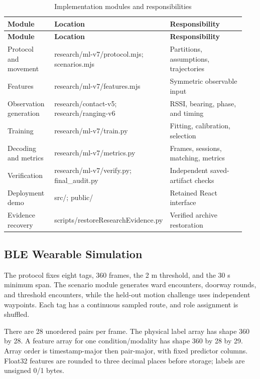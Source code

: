\documentclass[12pt,a4paper]{report}
\begin{document}
\begingroup
\small{}\setlength{\tabcolsep}{3pt}
\begin{longtable}{>{\raggedright\arraybackslash}p{0.200\linewidth}>{\raggedright\arraybackslash}p{0.400\linewidth}>{\raggedright\arraybackslash}p{0.340\linewidth}}
\caption{Implementation modules and responsibilities}\label{tab:files}\\
\toprule
\textbf{Module} & \textbf{Location} & \textbf{Responsibility}\\
\midrule
\endfirsthead
\toprule
\textbf{Module} & \textbf{Location} & \textbf{Responsibility}\\
\midrule
\endhead
\bottomrule
\endfoot
Protocol and movement & research/\allowbreak{}ml-v7/\allowbreak{}protocol.mjs; scenarios.mjs & Partitions, assumptions, trajectories\\
Features & research/\allowbreak{}ml-v7/\allowbreak{}features.mjs & Symmetric observable input\\
Observation generation & research/\allowbreak{}contact-v5; research/\allowbreak{}ranging-v6 & RSSI, bearing, phase, and timing\\
Training & research/\allowbreak{}ml-v7/\allowbreak{}train.py & Fitting, calibration, selection\\
Decoding and metrics & research/\allowbreak{}ml-v7/\allowbreak{}metrics.py & Frames, sessions, matching, metrics\\
Verification & research/\allowbreak{}ml-v7/\allowbreak{}verify.py; final\_audit.py & Independent saved-artifact checks\\
Deployment demo & src/\allowbreak{}; public/\allowbreak{} & Retained React interface\\
Evidence recovery & scripts/\allowbreak{}restore\allowbreak{}Research\allowbreak{}Evidence.py & Verified archive restoration\\
\end{longtable}
\endgroup


\subsection{BLE Wearable Simulation}
The protocol fixes eight tags, 360 frames, the 2 m threshold, and the 30 s minimum span. The scenario module generates ward encounters, doorway rounds, and threshold encounters, while the held-out motion challenge uses independent waypoints. Each tag has a continuous sampled route, and role assignment is shuffled.

There are 28 unordered pairs per frame. The physical label array has shape 360 by 28. A feature array for one condition/modality has shape 360 by 28 by 29. Array order is timestamp-major then pair-major, with fixed predictor columns. Float32 features are rounded to three decimal places before storage; labels are unsigned 0/1 bytes.
\end{document}
